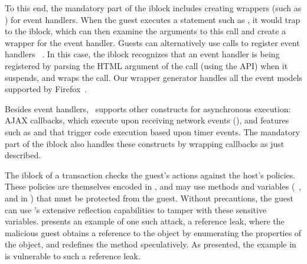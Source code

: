 To this end, the mandatory part of the iblock includes creating wrappers
(such as ) for event handlers. When the guest executes a
statement such as , it would trap to the
iblock, which can then examine the arguments to this call and create a wrapper
for the event handler.  Guests can alternatively use 
calls to register event handlers \eg~.  In this case, the iblock recognizes that an
event handler is being registered by parsing the HTML argument of the
 call (using the  API) when it
suspends, and wraps the call. Our wrapper generator handles all the event
 models  supported by Firefox~\cite{dom-level}.

Besides event handlers, \js\ supports other constructs for asynchronous
execution: AJAX callbacks, which execute upon receiving network events
(), and features such as  and
 that trigger code execution based upon timer events. The
mandatory part of the iblock also handles these constructs by wrapping
callbacks as just described.

\label{section:design:hiding}

The iblock of a transaction checks the guest's actions against the host's
policies. These policies are themselves encoded in \js, and may use methods and
variables (\eg~,  and  in
) that must be protected from the guest. Without
precautions, the guest can use \js's extensive reflection capabilities to
tamper with these sensitive variables.   presents an
example of one such attack, a reference leak, where the malicious guest obtains
a reference to the  object by enumerating the properties of the
 object, and redefines the method 
speculatively.  As presented, the example in  is
vulnerable to such a reference leak.

